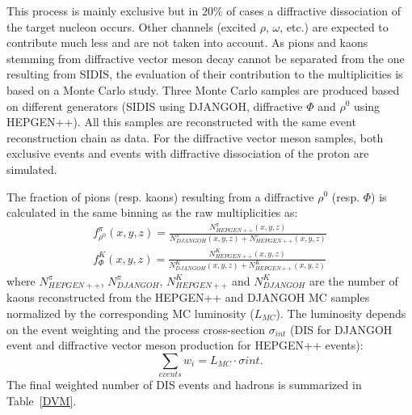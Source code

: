 This process is mainly exclusive but in $20$\% of cases a diffractive dissociation of the target nucleon occurs. Other channels (excited $\rho$, $\omega$, etc.) are expected to contribute much less and are not taken into account. As pions and kaons stemming from diffractive vector meson decay cannot be separated from the one resulting from SIDIS, the evaluation of their contribution to the multiplicities is based on a Monte Carlo study. Three Monte Carlo samples are produced based on different generators (SIDIS using DJANGOH, diffractive $\Phi$ and $\rho^0$ using HEPGEN++). All this samples are reconstructed with the same event reconstruction chain as data. For the diffractive vector meson samples, both exclusive events and events with diffractive dissociation of the proton are simulated.

The fraction of pions (resp. kaons) resulting from a diffractive $\rho^0$ (resp. $\Phi$) is calculated in the same binning as the raw multiplicities as:
%
\begin{equation}\label{eq:DVMhad}
  \begin{split}
    f^{\pi}_{\rho^0}(x,y,z) = \frac{N^{\pi}_{HEPGEN++}(x,y,z)}{N^{\pi}_{DJANGOH}(x,y,z)+N^{\pi}_{HEPGEN++}(x,y,z)} \\
    f^K_{\Phi}(x,y,z) = \frac{N^K_{HEPGEN++}(x,y,z)}{N^K_{DJANGOH}(x,y,z)+N^K_{HEPGEN++}(x,y,z)}
  \end{split}
\end{equation}
%
where $N^{\pi}_{HEPGEN++}$, $N^{\pi}_{DJANGOH}$, $N^K_{HEPGEN++}$ and $N^K_{DJANGOH}$ are the number of kaons reconstructed from the HEPGEN++ and DJANGOH MC samples normalized by the corresponding MC luminosity ($L_{MC}$). The luminosity depends on the event weighting and the process cross-section $\sigma_{int}$ (DIS for DJANGOH event and diffractive vector meson production for HEPGEN++ events):
%
\begin{equation} \label{eq:reweight}
  \sum_{events} w_i = L_{MC} \cdot \sigma{int}.
\end{equation}
%
The final weighted number of DIS events and hadrons is summarized in Table~\ref{DVM}.

